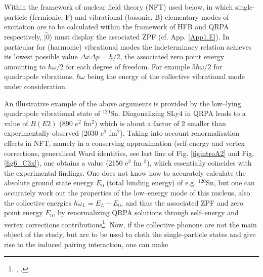 Within the framework of nuclear field theory (NFT) used below, in which single-particle (fermionic, F) and vibrational
(bosonic, B) elementary modes of excitation are to be calculated within the framework of HFB and QRPA
respectively, $|\tilde 0\rangle  $ must display the associated ZPF (cf. App. \ref{App1.E}). In particular for (harmonic) vibrational modes the indeterminacy relation achieves its lowest possible value 
$\Delta x \Delta p = \hbar/2$, the associated zero point energy amounting to $\hbar \omega/2$
for each degree of freedom. For example 5$\hbar \omega/2$ for quadrupole vibrations, 
$\hbar \omega$ being the energy of the collective vibrational mode under consideration. 




An illustrative example of the above arguments is provided by the low--lying quadrupole vibrational state of $^{120}$Sn. 
Diagonalizing SLy4 in QRPA leads to a value of $B(E2)$
(890 $e^2$ fm$^2$) which is about a factor of 2 smaller than experimentally observed (2030 $e^2$ fm$^2$). 
Taking into account  renormalisation effects in NFT, 
namely in a conserving  approximation (self-energy and vertex corrections, generalised Ward identities, see last line of Fig. \ref{figintroA2} and  Fig. \ref{fig6_C3x}), one obtains a value (2150 e$^2$ fm $^2$), 
which essentially coincides with 
the experimental findings. One does not know how to accurately calculate the absolute ground state energy 
$E_0$ (total binding energy) of e.g. $^{120}$Sn, but one can accurately work out 
the properties of the low--energy mode of this nucleus, also the collective energies 
$\hbar \omega_L =E_L - E_0$, and thus the associated ZPF and zero point energy $E_0$,
by renormalizing  QRPA solutions through self--energy and vertex corrections contributions\footnote{\cite{Barranco:04}, \cite{Bortignon:81}.}. 
Now, if the collective phonons are not the main object  of the study, but are to be used to cloth the single-particle states 
and give rise to the induced pairing interaction, one can make 

